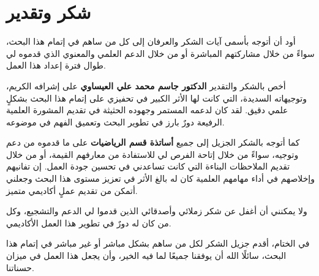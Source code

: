 \chapter*{شكر وتقدير}

\begin{doublespacing}
	\begin{center}
		أود أن أتوجه بأسمى آيات الشكر والعرفان إلى كل من ساهم في إتمام هذا البحث، سواءً من خلال مشاركتهم المباشرة أو من خلال الدعم العلمي والمعنوي الذي قدموه لي طوال فترة إعداد هذا العمل.
		
		أخص بالشكر والتقدير \textbf{الدكتور جاسم محمد علي العيساوي} على إشرافه الكريم، وتوجيهاته السديدة، التي كانت لها الأثر الكبير في تحفيزي على إتمام هذا البحث بشكلٍ علمي دقيق. لقد كان لدعمه المستمر وجهوده الحثيثة في تقديم المشورة العلمية الرفيعة دورٌ بارز في تطوير البحث وتعميق الفهم في موضوعه.
		
		كما أتوجه بالشكر الجزيل إلى جميع \textbf{أساتذة قسم الرياضيات} على ما قدموه من دعم وتوجيه، سواءً من خلال إتاحة الفرص لي للاستفادة من معارفهم القيمة، أو من خلال تقديم الملاحظات البناءة التي كانت تساعدني في تحسين جودة العمل. إن تفانيهم وإخلاصهم في أداء مهامهم العلمية كان له بالغ الأثر في تعزيز مستوى هذا البحث وجعلني أتمكن من تقديم عملٍ أكاديمي متميز.
		
		ولا يمكنني أن أغفل عن شكر زملائي وأصدقائي الذين قدموا لي الدعم والتشجيع، وكل من كان له دورٌ في تطوير هذا العمل الأكاديمي.
		
		في الختام، أقدم جزيل الشكر لكل من ساهم بشكل مباشر أو غير مباشر في إتمام هذا البحث، سائلًا الله أن يوفقنا جميعًا لما فيه الخير، وأن يجعل هذا العمل في ميزان حسناتنا.
	
\end{center}
\end{doublespacing}
